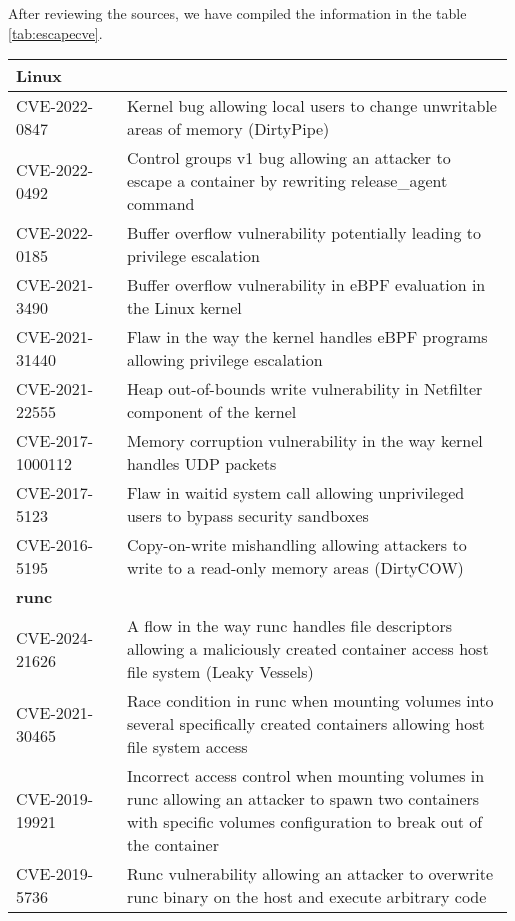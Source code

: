 After reviewing the sources, we have compiled the information in the table \ref{tab:escapecve}.


\begin{table}[hbt]
    \centering
    \begin{tabular}{| p{0.22\linewidth} | p{0.77\linewidth} |} \hline
        \multicolumn{2}{|l|}{\textbf{Linux}} \\ \hline
        CVE-2022-0847 & Kernel bug allowing local users to change unwritable areas of memory (DirtyPipe) \\ \hline
        CVE-2022-0492 & Control groups v1 bug allowing an attacker to escape a container by rewriting release\_agent command \\ \hline
        CVE-2022-0185 & Buffer overflow vulnerability potentially leading to privilege escalation \\ \hline
        CVE-2021-3490 & Buffer overflow vulnerability in eBPF evaluation in the Linux kernel \\ \hline
        CVE-2021-31440 & Flaw in the way the kernel handles eBPF programs allowing privilege escalation \\ \hline
        CVE-2021-22555 & Heap out-of-bounds write vulnerability in Netfilter component of the kernel \\ \hline
        CVE-2017-1000112 & Memory corruption vulnerability in the way kernel handles UDP packets \\ \hline
        CVE-2017-5123 & Flaw in waitid system call allowing unprivileged users to bypass security sandboxes \\ \hline
        CVE-2016-5195 & Copy-on-write mishandling allowing attackers to write to a read-only memory areas (DirtyCOW) \\ \hline
        \multicolumn{2}{|l|}{\textbf{runc}} \\ \hline
        CVE-2024-21626 & A flow in the way runc handles file descriptors allowing a maliciously created container access host file system (Leaky Vessels) \\ \hline
        CVE-2021-30465 & Race condition in runc when mounting volumes into several specifically created containers allowing host file system access \\ \hline
        CVE-2019-19921 & Incorrect access control when mounting volumes in runc allowing an attacker to spawn two containers with specific volumes configuration to break out of the container \\ \hline
        CVE-2019-5736 & Runc vulnerability allowing an attacker to overwrite runc binary on the host and execute arbitrary code  \\ \hline

\end{tabular}
\end{table}
